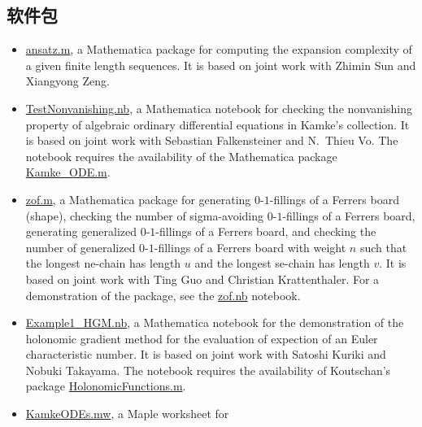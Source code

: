 \documentclass[a4paper,12pt]{article}
\begin{document}
\begin{CJK*}{UTF8}{gbsn}

\section*{\Large{软件包}}
\begin{itemize}
\item \href{https://yzhang1616.github.io/complexity/ansatz.m}{ansatz.m}, 
a Mathematica package for computing the expansion complexity of a given finite length sequences. 
It is based on joint work with Zhimin Sun and Xiangyong Zeng.
  \item \href{https://yzhang1616.github.io/TestNonvanishing.nb}{TestNonvanishing.nb}, 
    a Mathematica notebook for checking the nonvanishing property of algebraic ordinary
    differential equations in Kamke's collection. It is based on joint work
    with Sebastian Falkensteiner and N.\ Thieu Vo. 
    The notebook requires the availability of the Mathematica package \href{https://yzhang1616.github.io/Kamke_ODE.m}{Kamke\_ODE.m}.
  \item \href{https://yzhang1616.github.io/zof/zof.m}{zof.m}, a Mathematica package for generating $0$-$1$-fillings 
  of a Ferrers board (shape), checking the number of
    sigma-avoiding $0$-$1$-fillings of a Ferrers board, 
     generating generalized $0$-$1$-fillings of a Ferrers board, 
     and checking the number of generalized $0$-$1$-fillings of a Ferrers board with weight $n$
    such that the longest ne-chain has length $u$ 
    and the longest se-chain has length $v$. It is based on joint work with Ting
    Guo and Christian Krattenthaler. For a demonstration of the package,
    see the \href{https://yzhang1616.github.io/zof/zof.nb}{zof.nb} notebook. 
\item \href{https://yzhang1616.github.io/ec1/Example1_HGM.nb}{Example1\_HGM.nb}, a Mathematica notebook for
    the demonstration of the holonomic gradient method for the evaluation of
    expection of an Euler characteristic number. It is based on joint work
    with Satoshi Kuriki and Nobuki Takayama. 
    The notebook requires the availability of Koutschan's package 
     \href{http://www.risc.jku.at/research/combinat/software/ergosum/RISC/HolonomicFunctions.html}{HolonomicFunctions.m}.
 \item \href{https://yzhang1616.github.io/KamkeODEs.mw}{KamkeODEs.mw}, a Maple worksheet for 

\end{itemize}
\end{CJK*}
\end{document}
